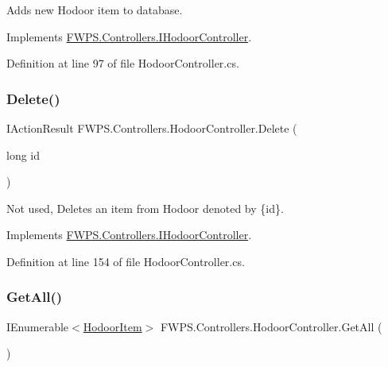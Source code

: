 Adds new Hodoor item to database. 



Implements \mbox{\hyperlink{interface_f_w_p_s_1_1_controllers_1_1_i_hodoor_controller_af4ec9b2bea258465475226f9693e26b3}{F\+W\+P\+S.\+Controllers.\+I\+Hodoor\+Controller}}.



Definition at line 97 of file Hodoor\+Controller.\+cs.

\mbox{\label{class_f_w_p_s_1_1_controllers_1_1_hodoor_controller_aa0b89f247140f77be91067dd79d68345}} 
\subsubsection{\texorpdfstring{Delete()}{Delete()}}
{\footnotesize\ttfamily I\+Action\+Result F\+W\+P\+S.\+Controllers.\+Hodoor\+Controller.\+Delete (\begin{DoxyParamCaption}\item[{long}]{id }\end{DoxyParamCaption})}



Not used, Deletes an item from Hodoor denoted by \{id\}. 



Implements \mbox{\hyperlink{interface_f_w_p_s_1_1_controllers_1_1_i_hodoor_controller_a8fe985f1171b270cd663c1e16bb198ee}{F\+W\+P\+S.\+Controllers.\+I\+Hodoor\+Controller}}.



Definition at line 154 of file Hodoor\+Controller.\+cs.

\mbox{\label{class_f_w_p_s_1_1_controllers_1_1_hodoor_controller_a862b9ad647c5e0ff7fda5dd5f359a040}} 
\subsubsection{\texorpdfstring{Get\+All()}{GetAll()}}
{\footnotesize\ttfamily I\+Enumerable$<$\mbox{\hyperlink{class_f_w_p_s_1_1_models_1_1_hodoor_item}{Hodoor\+Item}}$>$ F\+W\+P\+S.\+Controllers.\+Hodoor\+Controller.\+Get\+All (\begin{DoxyParamCaption}{ }\end{DoxyParamCaption})}



